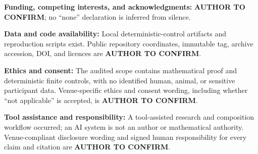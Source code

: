\documentclass[11pt]{article}
\theoremstyle{definition}
\newcommand{\AuthorConfirm}{\textbf{AUTHOR TO CONFIRM}}
\begin{document}
\noindent\textbf{Funding, competing interests, and acknowledgments:}
\AuthorConfirm; no ``none'' declaration is inferred from silence.

\noindent\textbf{Data and code availability:} Local deterministic-control
artifacts and reproduction scripts exist.  Public repository coordinates,
immutable tag, archive accession, DOI, and licences are \AuthorConfirm.

\noindent\textbf{Ethics and consent:} The audited scope contains
mathematical proof and deterministic finite controls, with no identified
human, animal, or sensitive participant data.  Venue-specific ethics and
consent wording, including whether ``not applicable'' is accepted, is
\AuthorConfirm.

\noindent\textbf{Tool assistance and responsibility:} A tool-assisted
research and composition workflow occurred; an AI system is not an author or
mathematical authority.  Venue-compliant disclosure wording and signed human
responsibility for every claim and citation are \AuthorConfirm.



\end{document}

